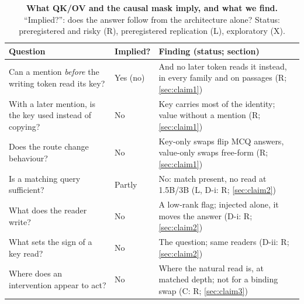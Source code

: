\begin{table}[t]
  \centering
  \caption{\textbf{What QK/OV and the causal mask imply, and what we find.} ``Implied?'': does the answer follow from the architecture alone? Status: preregistered and risky (R), preregistered replication (L), exploratory (X).}
  \label{tab:qkov}
  \footnotesize\setlength{\tabcolsep}{3pt}
  \begin{tabular}{@{}p{}p{}p{}@{}}
    \toprule
    Question & Implied? & Finding (status; section) \\
    \midrule
    Can a mention \emph{before} the writing token read its key? & Yes (no) & And no later token reads it instead, in every family and on passages (R; \cref{sec:claim1}) \\
    With a later mention, is the key used instead of copying? & No & Key carries most of the identity; value without a mention (R; \cref{sec:claim1}) \\
    Does the route change behaviour? & No & Key-only swaps flip MCQ answers, value-only swaps free-form (R; \cref{sec:claim1}) \\
    Is a matching query sufficient? & Partly & No: match present, no read at 1.5B/3B (L, D-i: R; \cref{sec:claim2}) \\
    What does the reader write? & No & A low-rank flag; injected alone, it moves the answer (D-i: R; \cref{sec:claim2}) \\
    What sets the sign of a key read? & No & The question; same readers (D-ii: R; \cref{sec:claim2}) \\
    Where does an intervention appear to act? & No & Where the natural read is, at matched depth; not for a binding swap (C: R; \cref{sec:claim3}) \\
    \bottomrule
  \end{tabular}
\end{table}
